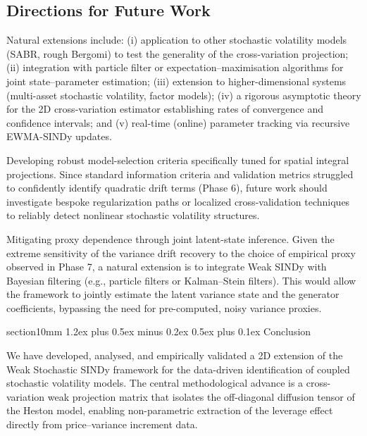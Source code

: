 \documentclass[reprint, amsmath, amssymb, aps, prl, superscriptaddress, nofootinbib]{revtex4-2}
\makeatletter
\def\section{\@startsection
  {section}{1}{0mm}
  {1.2ex plus 0.5ex minus 0.2ex}
  {0.5ex plus 0.1ex}
  {\centering\normalfont\small\bfseries}}
\makeatother
\begin{document}
\subsection{Directions for Future Work}

Natural extensions include: (i) application to other stochastic volatility models
(SABR, rough Bergomi) to test the generality of the cross-variation projection;
(ii) integration with particle filter or expectation--maximisation algorithms for
joint state--parameter estimation; (iii) extension to higher-dimensional systems
(multi-asset stochastic volatility, factor models); (iv) a rigorous asymptotic
theory for the 2D cross-variation estimator establishing rates of convergence
and confidence intervals; and (v) real-time (online) parameter tracking via
recursive EWMA-SINDy updates.

Developing robust model-selection criteria specifically tuned for spatial integral projections. Since standard information criteria and validation metrics struggled to confidently identify quadratic drift terms (Phase 6), future work should investigate bespoke regularization paths or localized cross-validation techniques to reliably detect nonlinear stochastic volatility structures.

Mitigating proxy dependence through joint latent-state inference. Given the extreme sensitivity of the variance drift recovery to the choice of empirical proxy observed in Phase 7, a natural extension is to integrate Weak SINDy with Bayesian filtering (e.g., particle filters or Kalman--Stein filters). This would allow the framework to jointly estimate the latent variance state and the generator coefficients, bypassing the need for pre-computed, noisy variance proxies.

\section{Conclusion}

We have developed, analysed, and empirically validated a 2D extension of the
Weak Stochastic SINDy framework for the data-driven identification of coupled
stochastic volatility models. The central methodological advance is a cross-variation
weak projection matrix that isolates the off-diagonal diffusion tensor of the Heston
model, enabling non-parametric extraction of the leverage effect directly from
price--variance increment data.
\end{document}
